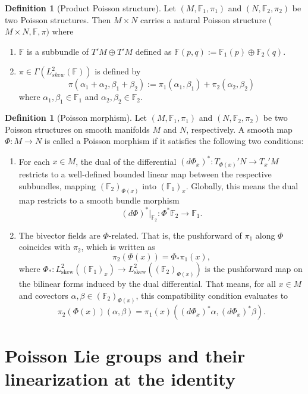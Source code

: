 \documentclass[11pt,reqno]{amsart}
\theoremstyle{definition}
\newtheorem{definition}[theorem]{Definition}
\numberwithin{equation}{section}
\begin{document}
\begin{definition}[Product Poisson structure]
Let $(M, \mathbb F_1, \pi_1)$ and $(N, \mathbb F_2, \pi_2)$ be two Poisson structures. Then $M\times N$ carries a natural Poisson structure ($M\times N, \mathbb F,  \pi)$ where
\begin{enumerate}
    \item $\mathbb F$ is a subbundle of $T'M\oplus T'M$ defined as $\mathbb F(p,q):=\mathbb F_1(p)\oplus \mathbb F_2(q).$
    \item $\pi \in \Gamma (L^2_{skew}(\mathbb F))$ is defined by \[
    \pi (\alpha_1+\alpha_2, \beta_1+\beta _2):=\pi_1(\alpha_1, \beta_1)+\pi_2(\alpha_2, \beta_2)
    \]  where $\alpha_1, \beta_1 \in \mathbb F_1$ and $\alpha_2, \beta_2 \in \mathbb F_2.$
    \end{enumerate}

\end{definition}

\begin{definition}[Poisson morphism]
Let $(M, \mathbb{F}_1, \pi_1)$ and $(N, \mathbb{F}_2, \pi_2)$ be two Poisson structures on smooth manifolds $M$ and $N$, respectively. A smooth map $\Phi: M \to N$ is called a Poisson morphism if it satisfies the following two conditions:
\begin{enumerate}
    \item For each $x \in M$, the dual of the differential $(d\Phi_x)^*: T_{\Phi(x)}'N \to T_x'M$ restricts to a well-defined bounded linear map between the respective subbundles, mapping $(\mathbb{F}_2)_{\Phi(x)}$ into $(\mathbb{F}_1)_x$. Globally, this means the dual map restricts to a smooth bundle morphism
    \[
    (d\Phi)^*|_{\mathbb{F}_2}: \Phi^*\mathbb{F}_2 \to \mathbb{F}_1.
    \]
    \item The bivector fields are $\Phi$-related. That is, the pushforward of $\pi_1$ along $\Phi$ coincides with $\pi_2$, which is written as
    \[
    \pi_2(\Phi(x)) = \Phi_*\pi_1(x),
    \]
    where $\Phi_* : L^2_{\text{skew}}((\mathbb{F}_1)_x) \to L^2_{\text{skew}}((\mathbb{F}_2)_{\Phi(x)})$ is the pushforward map on the bilinear forms induced by the dual differential. That means, for all $x \in M$ and covectors $\alpha, \beta \in (\mathbb{F}_2)_{\Phi(x)}$, this compatibility condition evaluates to
    \[
    \pi_2(\Phi(x))(\alpha, \beta) = \pi_1(x)((d\Phi_x)^*\alpha, (d\Phi_x)^*\beta).
    \]
\end{enumerate}
\end{definition}
\section{Poisson Lie groups and their linearization at the identity}\label{3}
\end{document}
